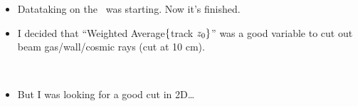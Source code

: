 

 

\begin{slide*}

\slideframe{}
\huge
{}

\begin{minipage}[t]{\linewidth}
\LARGE

\begin{itemize}
  \item Datataking on the \yss\ was starting. Now it's finished.

  \item I decided that ``Weighted Average$\large\{$track $z_0\large\}$''
  was a good variable to cut out beam gas/wall/cosmic rays (cut at 10 cm).

\begin{center}
   \\
\end{center}

  \item But I was looking for a good cut in 2D\ldots

\end{itemize}

\end{minipage}

\end{slide*}


